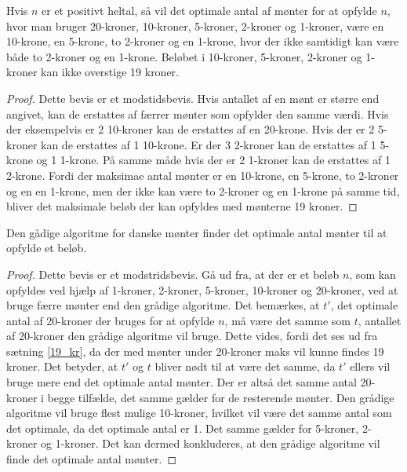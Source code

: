 \begin{thm}
\label{19_kr}
Hvis $n$ er et positivt heltal, så vil det optimale antal af mønter for at opfylde $n$, hvor man bruger 20-kroner, 10-kroner, 5-kroner, 2-kroner og 1-kroner, være en 10-krone, en 5-krone, to 2-kroner og en 1-krone, hvor der ikke samtidigt kan være både to 2-kroner og en 1-krone.
Beløbet i 10-kroner, 5-kroner, 2-kroner og 1-kroner kan ikke overstige 19 kroner.  
\end{thm}

\begin{proof}
\label{19_kr_bevis}
Dette bevis er et modstidsbevis. 
Hvis antallet af en mønt er større end angivet, kan de erstattes af færrer mønter som opfylder den samme værdi. 
Hvis der eksempelvis er 2 10-kroner kan de erstattes af en 20-krone. 
Hvis der er 2 5-kroner kan de erstattes af 1 10-krone. 
Er der 3 2-kroner kan de erstattes af 1 5-krone og 1 1-krone. 
På samme måde hvis der er 2 1-kroner kan de erstattes af 1 2-krone. 
Fordi der maksimae antal mønter er en 10-krone, en 5-krone, to 2-kroner og en en 1-krone, men der ikke kan være to 2-kroner og en 1-krone på samme tid, bliver det maksimale beløb der kan opfyldes med mønterne 19 kroner. 
\end{proof}

\begin{thm}
\label{gradig_satning}
Den gådige algoritme for danske mønter finder det optimale antal mønter til at opfylde et beløb.
\end{thm}

\begin{proof}
\label{gradig_bevis}
Dette bevis er et modstridsbevis. 
Gå ud fra, at der er et beløb $n$, som kan opfyldes ved hjælp af 1-kroner, 2-kroner, 5-kroner, 10-kroner og 20-kroner, ved at bruge færre mønter end den grådige algoritme. 
Det bemærkes, at $t'$, det optimale antal af 20-kroner der bruges for at opfylde $n$, må være det samme som $t$, antallet af 20-kroner den grådige algoritme vil bruge. 
Dette vides, fordi det ses ud fra sætning \ref{19_kr}, da der med mønter under 20-kroner maks vil kunne findes 19 kroner. 
Det betyder, at $t'$ og $t$ bliver nødt til at være det samme, da $t'$ ellers vil bruge mere end det optimale antal mønter. 
Der er altså det samme antal 20-kroner i begge tilfælde, det samme gælder for de resterende mønter. 
Den grådige algoritme vil bruge flest mulige 10-kroner, hvilket vil være det samme antal som det optimale, da det optimale antal er 1. 
Det samme gælder for 5-kroner, 2-kroner og 1-kroner. 
Det kan dermed konkluderes, at den grådige algoritme vil finde det optimale antal mønter.

\end{proof}

%